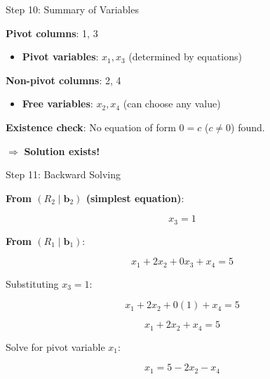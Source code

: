 \documentclass[10pt]{beamer}
\theoremstyle{definition}
\newcommand{\x}[1]{\alert{\textbf{#1}}}
\begin{document}
\begin{frame}{Step 10: Summary of Variables}

\x{Pivot columns}: 1, 3

\begin{itemize}
\item \x{Pivot variables}: $x_1, x_3$ (determined by equations)
\end{itemize}

\vspace{1em}

\x{Non-pivot columns}: 2, 4

\begin{itemize}
\item \x{Free variables}: $x_2, x_4$ (can choose any value)
\end{itemize}

\vspace{1em}

\x{Existence check}: No equation of form $0 = c$ ($c \neq 0$) found.

$\Rightarrow$ \textbf{Solution exists!}

\end{frame}

\begin{frame}{Step 11: Backward Solving}

\x{From $(R_2 \mid \mathbf{b}_2)$ (simplest equation)}:

$$x_3 = 1$$

\vspace{1em}

\x{From $(R_1 \mid \mathbf{b}_1)$}:

$$x_1 + 2x_2 + 0x_3 + x_4 = 5$$

Substituting $x_3 = 1$:

$$x_1 + 2x_2 + 0(1) + x_4 = 5$$

$$x_1 + 2x_2 + x_4 = 5$$

Solve for pivot variable $x_1$:

$$x_1 = 5 - 2x_2 - x_4$$

\end{frame}
\end{document}
